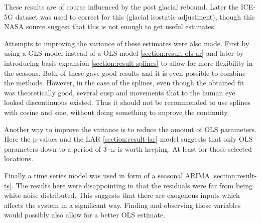 These results are of course influenced by the post glacial rebound. Later the ICE-5G dataset was  used to correct for this (glacial isostatic adjustment), though this NASA source \cite{NASA-GIA-incomplete} suggest that this is not enough to get useful estimates.

Attempts to improving the variance of these estimates were also made. First by using a GLS model instead of a OLS model \ref{section:result-ols-ar} and later by introducing basis expansion \ref{section:result-splines} to allow for more flexibility in the seasons. Both of these gave good results and it is even possible to combine the methods. However, in the case of the splines, even though the obtained fit was theoretically good, several cusp and movements that to the human eye looked discontinuous existed. Thus it should not be recommended to use splines with cosine and sine, without doing something to improve the continuity.

Another way to improve the variance is to reduce the amount of OLS parameters. Here the p-values and the LAR \ref{section:result-lar} model suggests that only OLS parameters down to a period of $3 \cdot \omega$ is worth keeping. At least for those selected locations.

Finally a time series model was used in form of a seasonal ARIMA \ref{section:result-ts}. The results here were disappointing in that the residuals were far from being white noise distributed. This suggests that there are exogenous inputs which affects the system in a significant way. Finding and observing those variables would possibly also allow for a better OLS estimate. 

